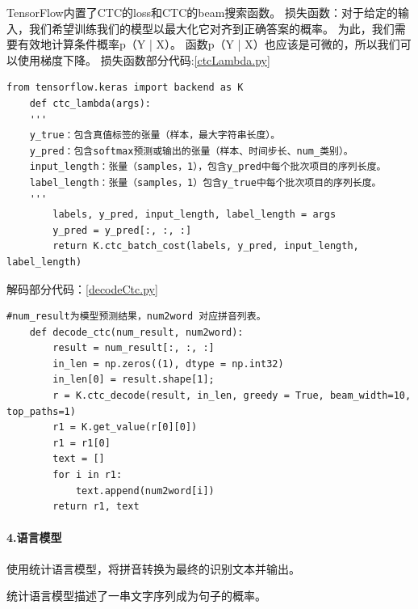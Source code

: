 \documentclass[12pt,a4paper,fancyhdr,openany,oneside]{ctexbook}
\begin{document}
TensorFlow内置了CTC的loss和CTC的beam搜索函数。
损失函数：对于给定的输入，我们希望训练我们的模型以最大化它对齐到正确答案的概率。 为此，我们需要有效地计算条件概率p（Y | X）。 函数p（Y | X）也应该是可微的，所以我们可以使用梯度下降。
损失函数部分代码:\ref{ctcLambda.py}

\begin{lstlisting}[style=Python, caption={ctcLambda.py}, label={ctcLambda.py}]
    from tensorflow.keras import backend as K
    def ctc_lambda(args):
    '''
    y_true：包含真值标签的张量（样本，最大字符串长度）。
    y_pred：包含softmax预测或输出的张量（样本、时间步长、num_类别）。
    input_length：张量（samples，1），包含y_pred中每个批次项目的序列长度。
    label_length：张量（samples，1）包含y_true中每个批次项目的序列长度。
    '''
        labels, y_pred, input_length, label_length = args
        y_pred = y_pred[:, :, :]
        return K.ctc_batch_cost(labels, y_pred, input_length, label_length)
\end{lstlisting}
解码部分代码：\ref{decodeCtc.py}
\begin{lstlisting}[style=Python, caption={decodeCtc.py}, label={decodeCtc.py}]
    #num_result为模型预测结果，num2word 对应拼音列表。
    def decode_ctc(num_result, num2word):
        result = num_result[:, :, :]
        in_len = np.zeros((1), dtype = np.int32)
        in_len[0] = result.shape[1];
        r = K.ctc_decode(result, in_len, greedy = True, beam_width=10, top_paths=1)
        r1 = K.get_value(r[0][0])
        r1 = r1[0]
        text = []
        for i in r1:
            text.append(num2word[i])
        return r1, text
\end{lstlisting}

\paragraph{4.语言模型} 使用统计语言模型，将拼音转换为最终的识别文本并输出。

统计语言模型描述了一串文字序列成为句子的概率。
\end{document}
